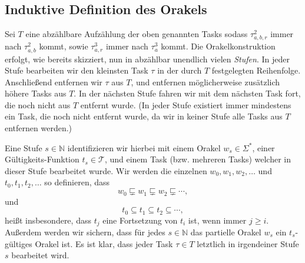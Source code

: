 \subsection*{Induktive Definition des Orakels}

Sei $T$ eine abzählbare Aufzählung der oben genannten Tasks sodass $\tau^2_{a,b,r}$ immer nach $\tau^2_{a,b}$ kommt, sowie $\tau^3_{a,r}$ immer nach $\tau^3_a$ kommt.
Die Orakelkonstruktion erfolgt, wie bereits skizziert, nun in abzählbar unendlich vielen \emph{Stufen}. In jeder Stufe bearbeiten wir den kleinsten Task $\tau$ in der durch $T$ festgelegten Reihenfolge. Anschließend entfernen wir $\tau$ aus $T$, und entfernen möglicherweise zusätzlich höhere Tasks aus $T$.
In der nächsten Stufe fahren wir mit dem nächsten Task fort, die noch nicht aus $T$ entfernt wurde. (In jeder Stufe existiert immer mindestens ein Task, die noch nicht entfernt wurde, da wir in keiner Stufe alle Tasks aus $T$ entfernen werden.)

Eine Stufe $s\in\mathbb N$ identifizieren wir hierbei mit einem Orakel $w_s\in\Sigma^*$, einer Gültigkeits-Funktion $t_s\in\mathcal T$, und einem Task (bzw. mehreren Tasks) welcher in dieser Stufe bearbeitet wurde.
Wir werden die einzelnen $w_0, w_1, w_2, \dots$ und $t_0, t_1, t_2, \dots$ so definieren, dass
\[ w_0\sqsubsetneq w_1 \sqsubsetneq w_2 \sqsubsetneq \cdots, \]
und 
\[ t_0 \subseteq t_1 \subseteq t_2 \subseteq \cdots, \]
heißt insbesondere, dass $t_j$ eine Fortsetzung von $t_i$ ist, wenn immer $j\geq i$.
Außerdem werden wir sichern, dass für jedes $s\in\mathbb N$ das partielle Orakel $w_s$ ein $t_s$-gültiges Orakel ist.
Es ist klar, dass jeder Task $\tau\in T$ letztlich in irgendeiner Stufe $s$ bearbeitet wird.


